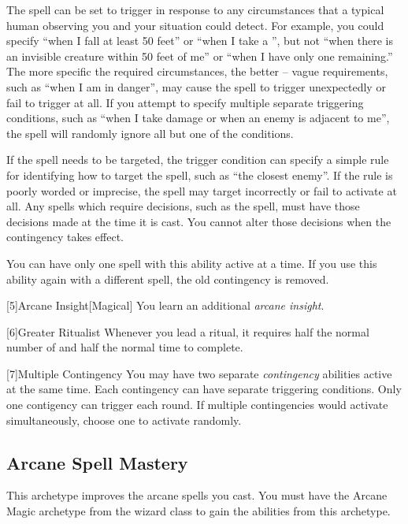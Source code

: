         The spell can be set to trigger in response to any circumstances that a typical human observing you and your situation could detect.
        For example, you could specify ``when I fall at least 50 feet'' or ``when I take a '', but not ``when there is an invisible creature within 50 feet of me'' or ``when I have only one  remaining.''
        The more specific the required circumstances, the better -- vague requirements, such as ``when I am in danger'', may cause the spell to trigger unexpectedly or fail to trigger at all.
        If you attempt to specify multiple separate triggering conditions, such as ``when I take damage or when an enemy is adjacent to me'', the spell will randomly ignore all but one of the conditions.

        If the spell needs to be targeted, the trigger condition can specify a simple rule for identifying how to target the spell, such as ``the closest enemy''.
        If the rule is poorly worded or imprecise, the spell may target incorrectly or fail to activate at all.
        Any spells which require decisions, such as the  spell, must have those decisions made at the time it is cast.
        You cannot alter those decisions when the contingency takes effect.

        You can have only one spell with this ability active at a time.
        If you use this ability again with a different spell, the old contingency is removed.

        [5]{Arcane Insight}[Magical]
        You learn an additional \textit{arcane insight}.

        [6]{Greater Ritualist} Whenever you lead a ritual, it requires half the normal number of  and half the normal time to complete.

        [7]{Multiple Contingency} You may have two separate \textit{contingency} abilities active at the same time.
        Each contingency can have separate triggering conditions.
        Only one contigency can trigger each round.
        If multiple contingencies would activate simultaneously, choose one to activate randomly.

    \newpage
    \subsection{Arcane Spell Mastery}
        This archetype improves the arcane spells you cast.
        You must have the Arcane Magic archetype from the wizard class to gain the abilities from this archetype.

